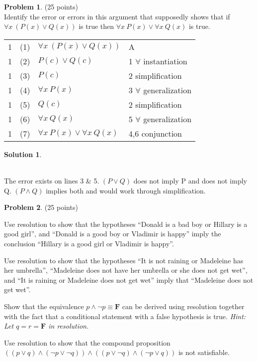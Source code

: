 \documentclass{article}
\theoremstyle{definition}
\newtheorem{problem}{Problem}
\newtheorem*{solution}{Solution}
\begin{document}
\newpage

\begin{problem} (25 points)\\
Identify the error or errors in this argument that supposedly shows that if $\forall x\ (P(x) \vee Q(x))$ is true then $\forall x\ P(x) \vee \forall x\ Q(x)$ is true.\\
\begin{tabular}{llll}
1 & (1) & $\forall x\ (P(x) \vee Q(x))$ & A\\
1 & (2) & $P(c) \vee Q(c)$ & 1 $\forall$ instantiation\\
1 & (3) & $P(c)$ & 2 simplification\\
1 & (4) & $\forall x\ P(x)$ & 3 $\forall$ generalization\\
1 & (5) & $Q(c)$ & 2 simplification\\
1 & (6) & $\forall x\ Q(x)$ & 5 $\forall$ generalization\\
1 & (7) & $\forall x\ P(x) \vee \forall x\ Q(x)$ & 4,6 conjunction
\end{tabular}
\end{problem}

\begin{solution}\ \\
\begin{compactenum}\ \\
The error exists on lines 3 \& 5. $(P \vee Q)$ does not imply P and does not imply Q. $(P \wedge Q)$ implies both and would work through simplification.

\end{compactenum}
\end{solution}

\newpage

\begin{problem} (25 points)\\
\begin{compactenum}
\item Use resolution to show that the hypotheses ``Donald is a bad boy or Hillary is a good girl'', and ``Donald is a good boy or Vladimir is happy'' imply the conclusion ``Hillary is a good girl or Vladimir is happy''.
\item Use resolution to show that the hypotheses ``It is not raining or Madeleine has her umbrella'', ``Madeleine does not have her umbrella or she does not get wet'', and ``It is raining or Madeleine does not get wet'' imply that ``Madeleine does not get wet''.
\item Show that the equivalence $p \wedge \neg p \equiv \mathbf{F}$ can be derived using resolution together with the fact that a conditional statement with a false hypothesis is true. \textit{Hint: Let $q=r=\mathbf{F}$ in resolution.}
\item Use resolution to show that the compound proposition $((p \vee q) \wedge (\neg p \vee \neg q)) \wedge ((p \vee \neg q) \wedge (\neg p \vee q))$ is not satisfiable.
\end{compactenum}
\end{problem}
\end{document}
